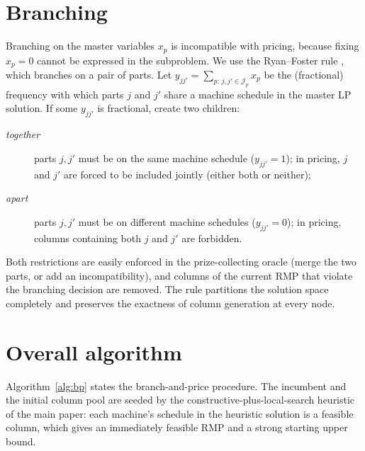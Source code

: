 \documentclass[review,3p,times,authoryear]{elsarticle}
\newcommand{\J}{\mathcal{J}}
\begin{document}
\section{Branching}
\label{sec:bp_branching}

Branching on the master variables $x_p$ is incompatible with pricing, because
fixing $x_p=0$ cannot be expressed in the subproblem. We use the Ryan--Foster
rule \citep{ryan1981}, which branches on a pair of parts. Let
$y_{jj'}=\sum_{p:\,j,j'\in\J_p}x_p$ be the (fractional) frequency with which
parts $j$ and $j'$ share a machine schedule in the master LP solution. If some
$y_{jj'}$ is fractional, create two children:
\begin{description}
\item[\textnormal{\emph{together}}] parts $j,j'$ must be on the same machine
schedule ($y_{jj'}=1$); in pricing, $j$ and $j'$ are forced to be included
jointly (either both or neither);
\item[\textnormal{\emph{apart}}] parts $j,j'$ must be on different machine
schedules ($y_{jj'}=0$); in pricing, columns containing both $j$ and $j'$ are
forbidden.
\end{description}
Both restrictions are easily enforced in the prize-collecting oracle (merge the
two parts, or add an incompatibility), and columns of the current RMP that
violate the branching decision are removed. The rule partitions the solution
space completely and preserves the exactness of column generation at every node.

\section{Overall algorithm}
\label{sec:bp_algorithm}

Algorithm~\ref{alg:bp} states the branch-and-price procedure. The incumbent and
the initial column pool are seeded by the constructive-plus-local-search
heuristic of the main paper: each machine's schedule in the heuristic solution is
a feasible column, which gives an immediately feasible RMP and a strong starting
upper bound.
\end{document}
